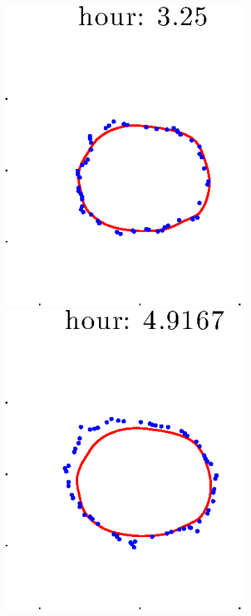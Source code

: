 \documentclass[12pt]{article}
\begin{document}
\begin{figure}[h!]
\begin{subfigure}[b]{.3\textwidth}
		\includegraphics[height=.15\textheight]{Pos10exp2/full/first3.eps}
		\includegraphics[height=.15\textheight]{Pos10exp2/full/first4.eps}

\end{subfigure}
\end{figure}
\end{document}
